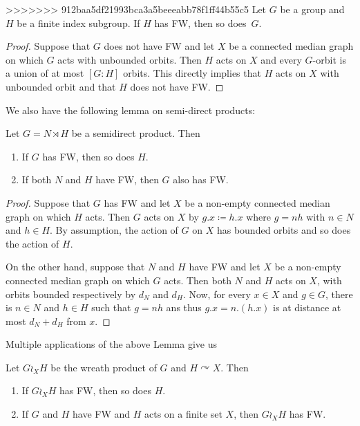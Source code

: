 \begin{lem}
\begin{lem}\label{Lemma:Subgroup}
>>>>>>> 912baa5df21993bca3a5beeeabb78f1ff44b55c5
Let $G$ be a group and $H$ be a finite index subgroup.
If $H$ has FW, then so does~$G$.
\end{lem}
\begin{proof}
Suppose that $G$ does not have FW and let $X$ be a connected median graph on which $G$ acts with unbounded orbits.
Then $H$ acts on $X$ and every $G$-orbit is a union of at most $[G:H]$ orbits. This directly implies that $H$ acts on $X$ with unbounded orbit and that $H$ does not have FW.
\end{proof}

We also have the following lemma on semi-direct products:
\begin{lem}\label{Lemma:Semidirect}
Let $G=N\rtimes H$ be a semidirect product. Then
\begin{enumerate}
\item
If $G$ has FW, then so does $H$.
\item
If both $N$ and $H$ have FW, then $G$ also has FW.
\end{enumerate}
\end{lem}
\begin{proof}
Suppose that $G$ has FW and let $X$ be a non-empty connected median graph on which $H$ acts.
Then $G$ acts on $X$ by $g.x\coloneqq h.x$ where $g=nh$ with $n\in N$ and $h\in H$.
By assumption, the action of $G$ on $X$ has bounded orbits and so does the action of $H$.

On the other hand, suppose that $N$ and $H$ have FW and let $X$ be a non-empty connected median graph on which $G$ acts.
Then both $N$ and $H$ acts on $X$, with orbits bounded respectively by $d_N$ and $d_H$.
Now, for every $x\in X$ and $g\in G$, there is $n\in N$ and $h\in H$ such that $g=nh$ ans thus $g.x=n.(h.x)$ is at distance at most $d_N+d_H$ from $x$.
\end{proof}
Multiple applications of the above Lemma give us
\begin{cor}\label{Cor:Wreath}
Let $G\wr_X H$ be the wreath product of $G$ and $H\curvearrowright X$.
Then
\begin{enumerate}
\item
If $G\wr_X H$ has FW, then so does $H$.
\item
If $G$ and $H$ have FW and $H$ acts on a finite set $X$, then $G\wr_X H$ has FW.
\end{enumerate}
\end{cor}








\end{lem}

